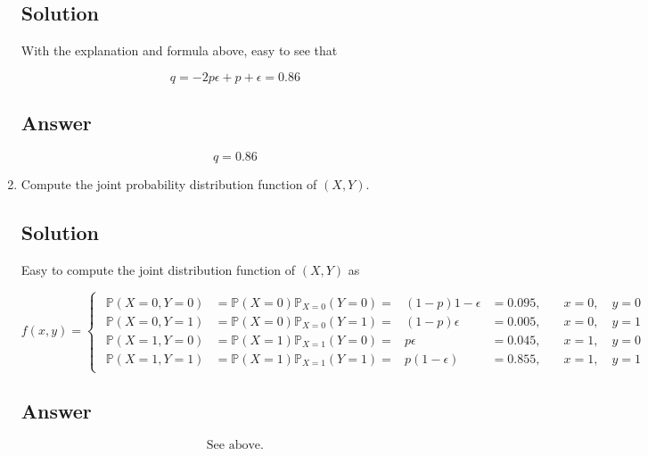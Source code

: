 \documentclass[12pt]{article}
\newcommand{\bP}{\mathbb{P}}
\begin{document}
\begin{enumerate}[start=1,label={\bfseries Part \arabic*:},leftmargin=0in]
		\subsection*{Solution}
		
			With the explanation and formula above, easy to see that
		
			\[q = -2p\epsilon + p + \epsilon = 0.86\]
		
		\subsection*{Answer}
		
			\[\boxed{q = 0.86}\]
			
		\bigskip\item Compute the joint probability distribution function of $(X,Y)$.
		
		\subsection*{Solution}
		
			Easy to compute the joint distribution function of $(X,Y)$ as
			
			\[
				f(x,y) =
					\begin{cases}
						\begin{aligned}
							\bP(X=0,Y=0) &= \bP(X=0)\bP_{X = 0}(Y = 0) = &(1-p)1 - \epsilon &= 0.095,&\quad x = 0,\quad y = 0\\
							\bP(X=0,Y=1) &= \bP(X=0)\bP_{X = 0}(Y = 1) = &(1-p)\epsilon &= 0.005,&\quad x = 0,\quad y = 1\\
							\bP(X=1,Y=0) &= \bP(X=1)\bP_{X = 1}(Y = 0) = &p\epsilon &= 0.045,&\quad x = 1,\quad y = 0\\
							\bP(X=1,Y=1) &= \bP(X=1)\bP_{X = 1}(Y = 1) = &p(1 - \epsilon) &= 0.855,&\quad x = 1,\quad y = 1
						\end{aligned}
					\end{cases}
			\]
		
		\subsection*{Answer}
		
			\[\boxed{\text{See above.}}\]
	\end{enumerate}
	
\end{document}
